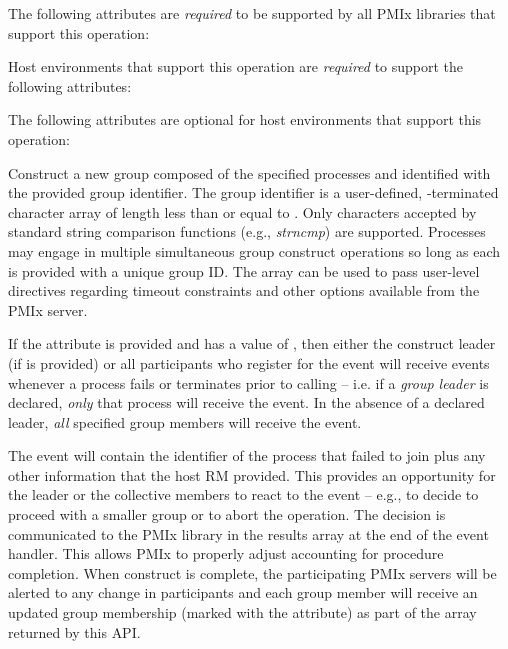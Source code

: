 \returnsimple

\reqattrstart
The following attributes are \textit{required} to be supported by all \ac{PMIx} libraries that support this operation:


Host environments that support this operation are \textit{required} to support the following attributes:


\reqattrend

\optattrstart
The following attributes are optional for host environments that support this operation:


\optattrend

\descr

Construct a new group composed of the specified processes and identified with the provided group identifier. The group identifier is a user-defined, -terminated character array of length less than or equal to . Only characters accepted by standard string comparison functions (e.g., \emph{strncmp}) are supported. Processes may engage in multiple simultaneous group construct operations so long as each is provided with a unique group ID. The  array can be used to pass user-level directives regarding timeout constraints and other options available from the \ac{PMIx} server.

If the  attribute is provided and has a value of , then either the construct leader (if  is provided) or all participants who register for the  event will receive events whenever a process fails or terminates prior to calling  – i.e. if a \emph{group leader} is declared, \textit{only} that process will receive the event. In the absence of a declared leader, \textit{all} specified group members will receive the event.

The event will contain the identifier of the process that failed to join plus any other information that the host \ac{RM} provided. This provides an opportunity for the leader or the collective members to react to the event – e.g., to decide to proceed with a smaller group or to abort the operation. The decision is communicated to the \ac{PMIx} library in the results array at the end of the event handler. This allows \ac{PMIx} to properly adjust accounting for procedure completion. When construct is complete, the participating \ac{PMIx} servers will be alerted to any change in participants and each group member will receive an updated group membership (marked with the  attribute) as part of the  array returned by this \ac{API}.

